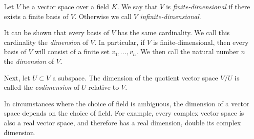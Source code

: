 \documentclass[12pt]{article}
\begin{document}
Let $V$ be a vector space over a field $K$.  We say that $V$ is
\emph{finite-dimensional} if there exists a finite basis of $V$. Otherwise we
call $V$ \emph{infinite-dimensional}.

It can be shown that every basis of $V$ has the same cardinality. We call this cardinality the \emph{dimension} of $V$. In particular, if
$V$ is finite-dimensional,  then every basis of $V$ will consist of a finite set $v_1,\ldots, v_n$.  We then call the natural number $n$ the \emph{dimension} of $V$. 

Next, let $U\subset V$ a subspace.  The dimension of the quotient
vector space $V/U$ is called the \emph{codimension} of $U$ relative to $V$.

In circumstances where the choice of field is ambiguous, the
dimension of a vector space depends on the choice of field.  For
example, every complex vector space is also a real vector space, and
therefore has a real dimension, double its complex dimension.
\end{document}
